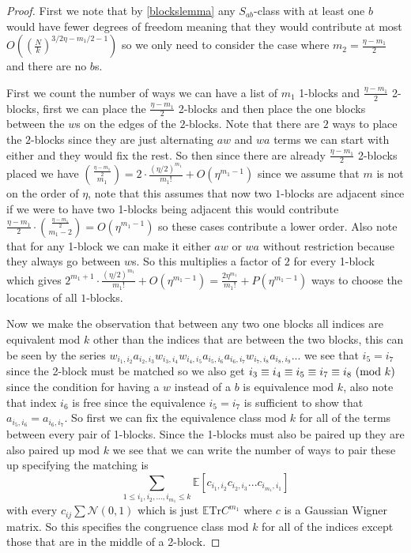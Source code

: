 \documentclass[12pt,reqno]{amsart}
\theoremstyle{plain} %
\theoremstyle{remark}
\theoremstyle{definition}
\renewcommand{\mod}[1]{\textup{ (mod~$#1$)}}
\begin{document}
\begin{proof}
First we note that by \ref{blockslemma} any $S_{ab}$-class with at least one $b$ would have fewer degrees of freedom meaning that they would contribute at most $O\left(\left(\frac{N}{k}\right)^{3/2 \eta - m_1/2-1}\right)$ so we only need to consider the case where $m_2=\frac{\eta-m_1}{2}$ and there are no $b$s.

First we count the number of ways we can have a list of $m_1$ 1-blocks and $\frac{\eta-m_1}{2}$ 2-blocks, first we can place the $\frac{\eta-m_1}{2}$ 2-blocks and then place the one blocks between the $w$s on the edges of the $2$-blocks. Note that there are $2$ ways to place the $2$-blocks since they are just alternating $aw$ and $wa$ terms we can start with either and they would fix the rest. So then since there are already $\frac{\eta-m_1}{2}$ 2-blocks placed we have $\binom{\frac{\eta-m_1}{2}}{m_1}=2\cdot \frac{(\eta/2)^{m_1}}{m_1!} + O(\eta^{m_1-1})$ since we assume that $m$ is not on the order of $\eta$, note that this assumes that now two $1$-blocks are adjacent since if we were to have two 1-blocks being adjacent this would contribute $\frac{\eta-m_1}{2}\cdot \binom{\frac{\eta-m_1}{2}}{m_1-2}=O(\eta^{m_1-1})$ so these cases contribute a lower order. Also note that for any 1-block we can make it either $aw$ or $wa$ without restriction because they always go between $w$s. So this multiplies a factor of $2$ for every 1-block which gives $2^{m_1+1}\cdot \frac{(\eta/2)^{m_1}}{m_1!} + O(\eta^{m_1-1})=\frac{2\eta^{m_1}}{m_1!}+P(\eta^{m_1-1})$ ways to choose the locations of all $1$-blocks.

Now we make the observation that between any two one blocks all indices are equivalent mod $k$ other than the indices that are between the two blocks, this can be seen by the series $w_{i_1,i_2}a_{i_2,i_3}w_{i_3,i_4}w_{i_4,i_5}a_{i_5,i_6}a_{i_6,i_7}w_{i_7,i_8}a_{i_8,i_9}...$ we see that $i_5=i_7$ since the 2-block must be matched so we also get $i_3\equiv i_4\equiv i_5\equiv i_7\equiv i_8\mod{k}$ since the condition for having a $w$ instead of a $b$ is equivalence mod $k$, also note that index $i_6$ is free since the equivalence $i_5=i_7$ is sufficient to show that $a_{i_5,i_6}=a_{i_6,i_7}$. So first we can fix the equivalence class mod $k$ for all of the terms between every pair of 1-blocks. Since the 1-blocks must also be paired up they are also paired up mod $k$ we see that we can write the number of ways to pair these up specifying the matching is
\[
\sum_{1\leq i_1,i_2,...,i_{m_1}\leq k}\mathbb{E}[c_{i_1,i_2}c_{i_2,i_3}...c_{i_{m_1},i_1}]
\]
with every $c_{ij}\sum\mathcal{N}(0,1)$ which is just $\mathbb{E}\text{Tr}C^{m_1}$ where $c$ is a Gaussian Wigner matrix. So this specifies the congruence class mod $k$ for all of the indices except those that are in the middle of a 2-block.


\end{proof}
\end{document}
